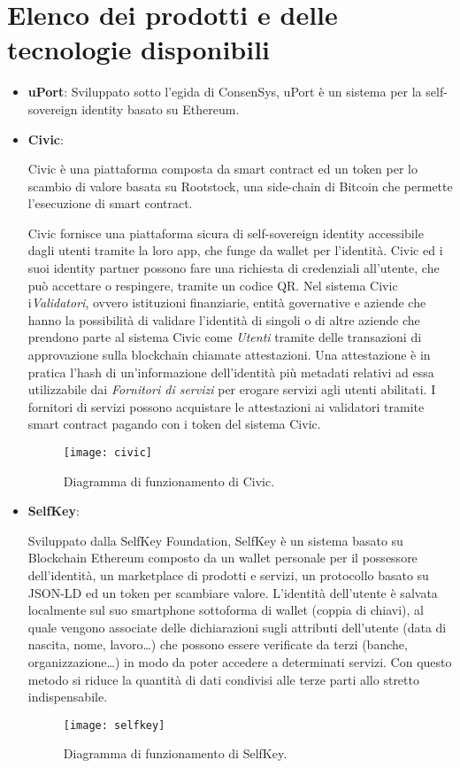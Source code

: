 \section{Elenco dei prodotti e delle tecnologie disponibili}

\begin{itemize}
  \item \textbf{uPort}:
  Sviluppato sotto l’egida di ConsenSys, uPort è un sistema per la self-sovereign identity basato su Ethereum. 

  \item \textbf{Civic}:

  Civic è una piattaforma composta da smart contract ed un token per lo scambio
  di valore basata su Rootstock, una side-chain di Bitcoin che permette l’esecuzione di smart contract.

  Civic fornisce una piattaforma sicura di self-sovereign identity accessibile dagli utenti tramite
  la loro app, che funge da wallet per l’identità.
  Civic ed i suoi identity partner possono fare una richiesta di credenziali all’utente, che può 
  accettare o respingere, tramite un codice QR.
  Nel sistema Civic i\emph{Validatori}, ovvero istituzioni finanziarie, entità governative e aziende che hanno la possibilità
  di validare l’identità di singoli o di altre aziende che prendono parte al sistema
  Civic come \emph{Utenti} tramite delle transazioni di approvazione sulla blockchain chiamate attestazioni.
  Una attestazione è in pratica l’hash di un’informazione dell’identità più metadati relativi ad essa
  utilizzabile dai \emph{Fornitori di servizi} per erogare servizi agli utenti abilitati. I fornitori di servizi possono
  acquistare le attestazioni ai validatori tramite smart contract pagando con i token del sistema Civic.

  \begin{figure}[!ht]
    \texttt{[image: civic]}
    \caption{Diagramma di funzionamento di Civic.}
    \label{fig:civic}
  \end{figure}

  \item \textbf{SelfKey}:

  Sviluppato dalla SelfKey Foundation, SelfKey è un sistema basato su Blockchain Ethereum composto
  da un wallet personale per il possessore dell’identità, un marketplace di prodotti e servizi,
  un protocollo basato su JSON-LD ed un token per scambiare valore.
  L’identità dell’utente è salvata localmente sul suo smartphone sottoforma di wallet (coppia di chiavi),
  al quale vengono associate delle dichiarazioni sugli attributi dell’utente (data di nascita, nome, lavoro…) 
  che possono essere verificate da terzi (banche, organizzazione…)
  in modo da poter accedere a determinati servizi. Con questo metodo si riduce
  la quantità di dati condivisi alle terze parti allo stretto indispensabile.
  
  \begin{figure}[!ht]
    \texttt{[image: selfkey]}
    \caption{Diagramma di funzionamento di SelfKey.}
    \label{fig:selfkey}
  \end{figure}
\end{itemize}

